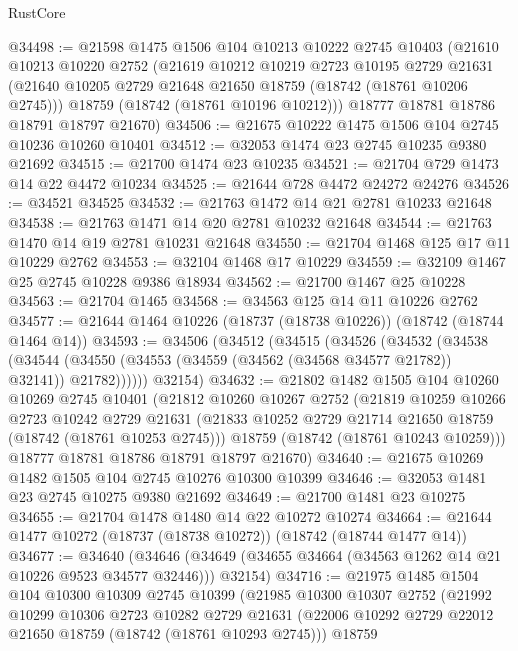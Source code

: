 \begin{lexlean}{RustCore}
\begin{coremodule}
@34498 := @21598
    @1475
    @1506
    @104
    @10213
    @10222
    @2745
    @10403
    (@21610
      @10213
      @10220
      @2752
      (@21619
        @10212
        @10219
        @2723
        @10195
        @2729
        @21631
        (@21640 @10205 @2729 @21648 @21650 @18759 (@18742 (@18761 @10206 @2745)))
        @18759
        (@18742 (@18761 @10196 @10212)))
      @18777
      @18781
      @18786
      @18791
      @18797
      @21670)
@34506 := @21675 @10222 @1475 @1506 @104 @2745 @10236 @10260 @10401
@34512 := @32053 @1474 @23 @2745 @10235 @9380 @21692
@34515 := @21700 @1474 @23 @10235
@34521 := @21704 @729 @1473 @14 @22 @4472 @10234
@34525 := @21644 @728 @4472 @24272 @24276
@34526 := @34521 @34525
@34532 := @21763 @1472 @14 @21 @2781 @10233 @21648
@34538 := @21763 @1471 @14 @20 @2781 @10232 @21648
@34544 := @21763 @1470 @14 @19 @2781 @10231 @21648
@34550 := @21704 @1468 @125 @17 @11 @10229 @2762
@34553 := @32104 @1468 @17 @10229
@34559 := @32109 @1467 @25 @2745 @10228 @9386 @18934
@34562 := @21700 @1467 @25 @10228
@34563 := @21704 @1465
@34568 := @34563 @125 @14 @11 @10226 @2762
@34577 := @21644 @1464 @10226 (@18737 (@18738 @10226)) (@18742 (@18744 @1464 @14))
@34593 := @34506
    (@34512
      (@34515
        (@34526
          (@34532
            (@34538
              (@34544 (@34550 (@34553 (@34559 (@34562 (@34568 @34577 @21782)) @32141)) @21782))))))
      @32154)
@34632 := @21802
    @1482
    @1505
    @104
    @10260
    @10269
    @2745
    @10401
    (@21812
      @10260
      @10267
      @2752
      (@21819
        @10259
        @10266
        @2723
        @10242
        @2729
        @21631
        (@21833 @10252 @2729 @21714 @21650 @18759 (@18742 (@18761 @10253 @2745)))
        @18759
        (@18742 (@18761 @10243 @10259)))
      @18777
      @18781
      @18786
      @18791
      @18797
      @21670)
@34640 := @21675 @10269 @1482 @1505 @104 @2745 @10276 @10300 @10399
@34646 := @32053 @1481 @23 @2745 @10275 @9380 @21692
@34649 := @21700 @1481 @23 @10275
@34655 := @21704 @1478 @1480 @14 @22 @10272 @10274
@34664 := @21644 @1477 @10272 (@18737 (@18738 @10272)) (@18742 (@18744 @1477 @14))
@34677 := @34640
    (@34646 (@34649 (@34655 @34664 (@34563 @1262 @14 @21 @10226 @9523 @34577 @32446))) @32154)
@34716 := @21975
    @1485
    @1504
    @104
    @10300
    @10309
    @2745
    @10399
    (@21985
      @10300
      @10307
      @2752
      (@21992
        @10299
        @10306
        @2723
        @10282
        @2729
        @21631
        (@22006 @10292 @2729 @22012 @21650 @18759 (@18742 (@18761 @10293 @2745)))
        @18759

\end{coremodule}
\end{lexlean}
